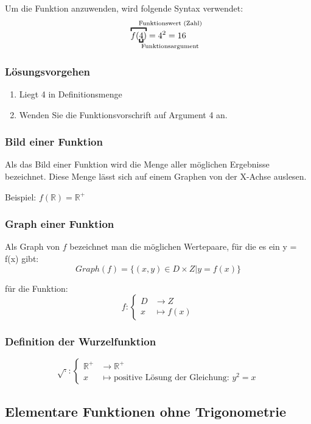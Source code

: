 \begin{multicols}{2}
	Um die Funktion anzuwenden, wird folgende Syntax verwendet:
	\[\overbracket{
		f(\underbracket{4}_{\mathrlap{\text{Funktionsargument}}})
	}^{\mathrlap{\text{Funktionswert (Zahl)}}}
	= 4^2 = 16
	\]
	
\subsubsection{Lösungsvorgehen}
	\begin{enumerate}
		\item Liegt 4 in Definitionsmenge
		\item Wenden Sie die Funktionsvorschrift auf Argument 4 an.
	\end{enumerate}

\subsubsection{Bild einer Funktion}
	Als das Bild einer Funktion wird die Menge aller möglichen Ergebnisse bezeichnet. Diese Menge lässt sich auf einem Graphen von der X-Achse auslesen.
	
	Beispiel: $f(\mathbb{R}) = \mathbb{R}^+$
	
\subsubsection{Graph einer Funktion}
	Als Graph von $f$ bezeichnet man die möglichen Wertepaare, für die es ein y = f(x) gibt:
	\[
		Graph(f) = \{(x,y) \in D \times Z | y=f(x)\}
	\]
	
	für die Funktion: 
	\[
		f:
		\begin{cases}
			D &\to Z \\
			x &\mapsto f(x)
		\end{cases}
	\]

\subsubsection{Definition der Wurzelfunktion}
	\[
		 \sqrt{\cdot} : \begin{cases}
			 \mathbb{R}^+ &\to \mathbb{R}^+ \\
			 x & \mapsto \text{positive Lösung der Gleichung: $y^2=x$}
		 \end{cases}
	\]


\subsection{Elementare Funktionen ohne Trigonometrie}


\end{multicols}
